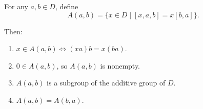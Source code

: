 For any $a, b \in D$, define
$$A(a, b) = \{x \in D \mid [x, a, b] = x[b, a]\}.$$

Then:
\begin{enumerate}
\item $x \in A(a, b) \iff (xa)b = x(ba)$.
\item $0 \in A(a, b)$, so $A(a, b)$ is nonempty.
\item $A(a, b)$ is a subgroup of the additive group of $D$.
\item $A(a, b) = A(b, a)$.
\end{enumerate}
